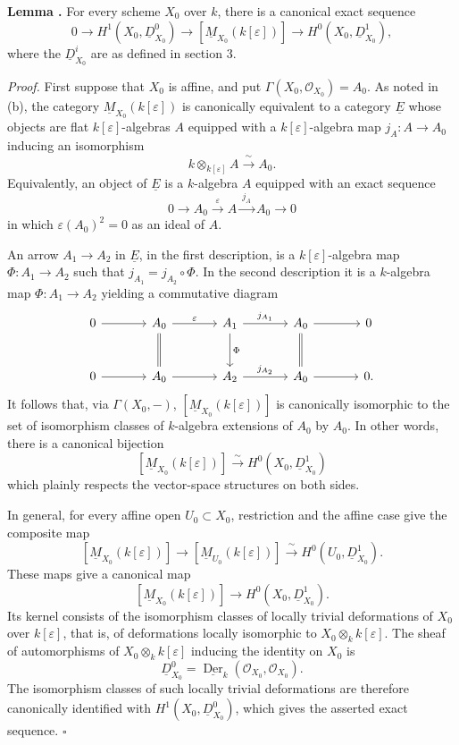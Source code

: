 
\medskip
\noindent\textbf{Lemma .}
For every scheme $X_0$ over $k$, there is a canonical exact sequence
\[
0\longrightarrow H^1(X_0,\underline D^0_{X_0})
\longrightarrow[\underline M_{X_0}(k[\varepsilon])]
\longrightarrow H^0(X_0,\underline D^1_{X_0}),
\]
where the $\underline D^i_{X_0}$ are as defined in section 3.

\medskip
\noindent\textit{Proof.}
First suppose that $X_0$ is affine, and put
$\Gamma(X_0,\mathcal O_{X_0})=A_0$. As noted in (b), the category
$\underline M_{X_0}(k[\varepsilon])$ is canonically equivalent to a
category $\underline E$ whose objects are flat $k[\varepsilon]$-algebras
$A$ equipped with a $k[\varepsilon]$-algebra map
$j_A:A\longrightarrow A_0$ inducing an isomorphism
\[
k\otimes_{k[\varepsilon]}A\xrightarrow{\ \sim\ }A_0.
\]
Equivalently, an object of $\underline E$ is a $k$-algebra $A$
equipped with an exact sequence
\[
0\longrightarrow A_0\xrightarrow{\ \varepsilon\ }A
\xrightarrow{\ j_A\ }A_0\longrightarrow0
\]
in which $\varepsilon(A_0)^2=0$ as an ideal of $A$.

An arrow $A_1\longrightarrow A_2$ in $\underline E$, in the first
description, is a $k[\varepsilon]$-algebra map
$\Phi:A_1\longrightarrow A_2$ such that
$j_{A_1}=j_{A_2}\circ\Phi$. In the second description it is a
$k$-algebra map $\Phi:A_1\longrightarrow A_2$ yielding a commutative
diagram
\[
\begin{tikzcd}[column sep=large,row sep=large]
0 \arrow[r]
& A_0 \arrow[r,"\varepsilon"] \arrow[d,equal]
& A_1 \arrow[r,"j_{A_1}"] \arrow[d,"\Phi"]
& A_0 \arrow[r] \arrow[d,equal]
& 0 \\
0 \arrow[r]
& A_0 \arrow[r]
& A_2 \arrow[r,"j_{A_2}"]
& A_0 \arrow[r]
& 0.
\end{tikzcd}
\]
It follows that, via $\Gamma(X_0,-)$,
$[\underline M_{X_0}(k[\varepsilon])]$ is canonically isomorphic to
the set of isomorphism classes of $k$-algebra extensions of $A_0$ by
$A_0$. In other words, there is a canonical bijection
\[
[\underline M_{X_0}(k[\varepsilon])]
\xrightarrow{\ \sim\ }H^0(X_0,\underline D^1_{X_0})
\]
which plainly respects the vector-space structures on both sides.


In general, for every affine open $U_0\subset X_0$, restriction and
the affine case give the composite map
\[
[\underline M_{X_0}(k[\varepsilon])]
\longrightarrow[\underline M_{U_0}(k[\varepsilon])]
\xrightarrow{\ \sim\ }H^0(U_0,\underline D^1_{X_0}).
\]
These maps give a canonical map
\[
[\underline M_{X_0}(k[\varepsilon])]
\longrightarrow H^0(X_0,\underline D^1_{X_0}).
\]
Its kernel consists of the isomorphism classes of locally trivial
deformations of $X_0$ over $k[\varepsilon]$, that is, of deformations
locally isomorphic to $X_0\otimes_k k[\varepsilon]$. The sheaf of
automorphisms of $X_0\otimes_k k[\varepsilon]$ inducing the identity
on $X_0$ is
\[
\underline D^0_{X_0}
=\underline{\operatorname{Der}}_k
  (\mathcal O_{X_0},\mathcal O_{X_0}).
\]
The isomorphism classes of such locally trivial deformations are
therefore canonically identified with
$H^1(X_0,\underline D^0_{X_0})$, which gives the asserted exact
sequence. \hfill$\square$
